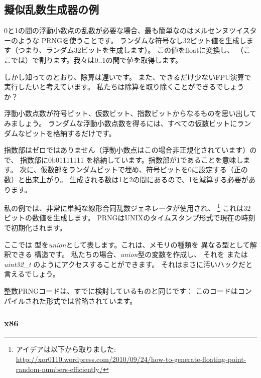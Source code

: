 \subsection{擬似乱数生成器の例}
\label{FPU_PRNG}

0と1の間の浮動小数点の乱数が必要な場合、最も簡単なのはメルセンヌツイスターのような
\ac{PRNG}を使うことです。
ランダムな符号なし32ビット値を生成します（つまり、ランダム32ビットを生成します）。
この値をfloatに変換し、
（ここでは）で割ります。我々は0..1の間で値を取得します。

しかし知ってのとおり、除算は遅いです。
また、できるだけ少ないFPU演算で実行したいと考えています。
私たちは除算を取り除くことができるでしょうか？


浮動小数点数が符号ビット、仮数ビット、指数ビットからなるものを思い出してみましょう。
ランダムな浮動小数点数を得るには、すべての仮数ビットにランダムなビットを格納するだけです。

指数部はゼロではありません（浮動小数点はこの場合非正規化されています）ので、
指数部に0b01111111
を格納しています。指数部が1であることを意味します。
次に、仮数部をランダムビットで埋め、符号ビットを0に設定する（正の数）と出来上がり。
生成される数は1と2の間にあるので、1を減算する必要があります。

\newcommand{\URLXOR}{\url{http://xor0110.wordpress.com/2010/09/24/how-to-generate-floating-point-random-numbers-efficiently/}}

私の例では、非常に単純な線形合同乱数ジェネレータが使用され、
\footnote{アイデアは以下から取りました: \URLXOR} これは32ビットの数値を生成します。 
\ac{PRNG}はUNIXのタイムスタンプ形式で現在の時刻で初期化されます。

ここでは \Tfloat 型を\emph{union}として表します。これは、メモリの種類を
異なる型として解釈できる \CCpp 構造です。
私たちの場合、\emph{union}型の変数を作成し、
それを \Tfloat  または \emph{uint32\_t} のようにアクセスすることができます。
それはまさに汚いハックだと言えるでしょう。


整数\ac{PRNG}コードは、すでに検討しているものと同じです：
このコードはコンパイルされた形式では省略されています。



\subsubsection{x86}

